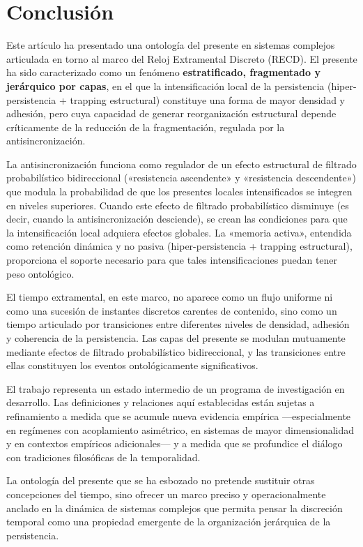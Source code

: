 \section{Conclusión}

Este artículo ha presentado una ontología del presente en sistemas complejos articulada en torno al marco del Reloj Extramental Discreto (RECD). El presente ha sido caracterizado como un fenómeno \textbf{estratificado, fragmentado y jerárquico por capas}, en el que la intensificación local de la persistencia (hiper-persistencia + trapping estructural) constituye una forma de mayor densidad y adhesión, pero cuya capacidad de generar reorganización estructural depende críticamente de la reducción de la fragmentación, regulada por la antisincronización.

La antisincronización funciona como regulador de un efecto estructural de filtrado probabilístico bidireccional («resistencia ascendente» y «resistencia descendente») que modula la probabilidad de que los presentes locales intensificados se integren en niveles superiores. Cuando este efecto de filtrado probabilístico disminuye (es decir, cuando la antisincronización desciende), se crean las condiciones para que la intensificación local adquiera efectos globales. La «memoria activa», entendida como retención dinámica y no pasiva (hiper-persistencia + trapping estructural), proporciona el soporte necesario para que tales intensificaciones puedan tener peso ontológico.

El tiempo extramental, en este marco, no aparece como un flujo uniforme ni como una sucesión de instantes discretos carentes de contenido, sino como un tiempo articulado por transiciones entre diferentes niveles de densidad, adhesión y coherencia de la persistencia. Las capas del presente se modulan mutuamente mediante efectos de filtrado probabilístico bidireccional, y las transiciones entre ellas constituyen los eventos ontológicamente significativos.

El trabajo representa un estado intermedio de un programa de investigación en desarrollo. Las definiciones y relaciones aquí establecidas están sujetas a refinamiento a medida que se acumule nueva evidencia empírica —especialmente en regímenes con acoplamiento asimétrico, en sistemas de mayor dimensionalidad y en contextos empíricos adicionales— y a medida que se profundice el diálogo con tradiciones filosóficas de la temporalidad.

La ontología del presente que se ha esbozado no pretende sustituir otras concepciones del tiempo, sino ofrecer un marco preciso y operacionalmente anclado en la dinámica de sistemas complejos que permita pensar la discreción temporal como una propiedad emergente de la organización jerárquica de la persistencia.